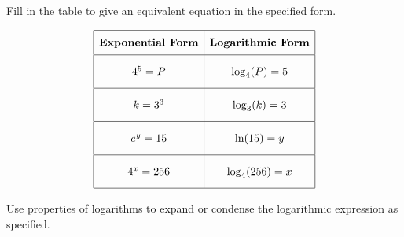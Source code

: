 \documentclass[11pt]{exam}
\begin{document}
\begin{questions}
\newpage

\headerbox{\ocf}
\label{exact-startocf}

\question[5]
Fill in the table to give an equivalent equation in the specified form.\\
{\centering {\renewcommand{\arraystretch}{3}
\[
\begin{array}{|c|c|} \hline  \textbf{Exponential Form} & \textbf{Logarithmic Form} \\ \hline  \hspace{75mm} & \log_{4}(P) = 5 \\ \hline  \hspace{75mm} & \log_{3}(k) = 3 \\ \hline  e^{y} = 15 & \hspace{75mm} \\ \hline  4^{x} = 256 & \hspace{75mm} \\ \hline \end{array}
\]
}}

\begin{solution}
\[\begin{array}{|c|c|} \hline \rule[-0.8em]{0pt}{2.2em} \textbf{Exponential Form} & \textbf{Logarithmic Form} \\ \hline \rule[-1.2em]{0pt}{3em} 4^{5} = P & \log_{4}(P) = 5 \\ \hline \rule[-1.2em]{0pt}{3em} k = 3^{3} & \log_{3}(k) = 3 \\ \hline \rule[-1.2em]{0pt}{3em} e^{y} = 15 & \ln(15) = y \\ \hline \rule[-1.2em]{0pt}{3em} 4^{x} = 256 & \log_{4}(256) = x \\ \hline \end{array}\]
\end{solution}

\question Use properties of logarithms to expand or condense the logarithmic expression as specified.
\end{questions}
\end{document}
